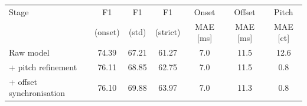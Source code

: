 \begin{tabular}{lcccccc}
\hline
Stage & F1 & F1 & F1 & Onset & Offset & Pitch \\
      & (onset) & (std) & (strict) & MAE [ms] & MAE [ms] & MAE [ct] \\
\hline
Raw model & 74.39 & 67.21 & 61.27 & 7.0 & 11.5 & 12.6 \\
+ pitch refinement & 76.11 & 68.85 & 62.75 & 7.0 & 11.5 & 0.8 \\
+ offset synchronisation & 76.10 & 69.88 & 63.97 & 7.0 & 11.3 & 0.8 \\
\hline
\end{tabular}
